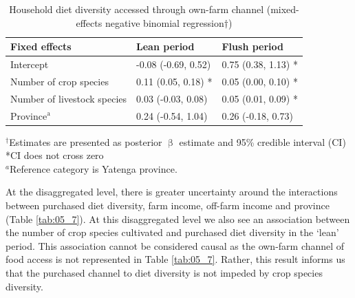\begin{table}
  \captionsetup{singlelinecheck = false, justification=justified}
  \caption{Household diet diversity accessed through own-farm channel (mixed-effects negative binomial regression${\dag}$)}
  \label{tab:05_6}
  \small
\begin{tabularx}{\textwidth}{@{}lYY@{}}
\toprule
Fixed effects & Lean period & Flush period \\
 \midrule
Intercept & -0.08 (-0.69, 0.52) & 0.75 (0.38, 1.13) * \\
Number of crop species & 0.11 (0.05, 0.18) * & 0.05 (0.00, 0.10) * \\
Number of livestock species & 0.03 (-0.03, 0.08) & 0.05 (0.01, 0.09) * \\
Province$^{\mathrm{a}}$ & 0.24 (-0.54, 1.04) & 0.26 (-0.18, 0.73) \\
\bottomrule
\end{tabularx}
\footnotesize
\raggedright
$^{\dag}$Estimates are presented as posterior ${\upbeta}$ estimate and 95\% credible interval (CI)\\
*CI does not cross zero\\
$^a$Reference category is Yatenga province.%
\end{table}



At the disaggregated level, there is greater uncertainty around the interactions between purchased diet diversity, farm income, off-farm income and province (Table \ref{tab:05_7}). At this disaggregated level we also see an association between the number of crop species cultivated and purchased diet diversity in the `lean' period. This association cannot be considered causal as the own-farm channel of food access is not represented in Table \ref{tab:05_7}. Rather, this result informs us that the purchased channel to diet diversity is not impeded by crop species diversity.

